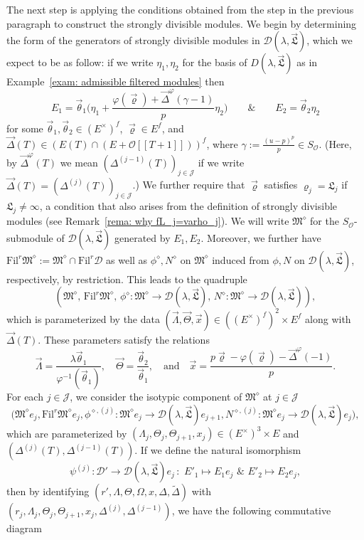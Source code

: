 \documentclass[11pt]{amsart}
\theoremstyle{definition}
\numberwithin{equation}{subsection}
\theoremstyle{plain}
\theoremstyle{plain}
\theoremstyle{plain}
\theoremstyle{plain}
\theoremstyle{plain}
\theoremstyle{plain}
\theoremstyle{plain}
\theoremstyle{plain}
\theoremstyle{plain}
\theoremstyle{plain}
\theoremstyle{plain}
\theoremstyle{plain}
\theoremstyle{definition}
\theoremstyle{definition}
\theoremstyle{definition}
\theoremstyle{remark}
\renewcommand{\(}{\textup{(}}
\renewcommand{\)}{\textup{)}}
\newcommand{\fM}{\mathfrak{M}}
\newcommand{\fL}{\mathfrak{L}}
\newcommand{\Fil}{\mathrm{Fil}}
\newcommand{\cD}{\mathcal{D}}
\newcommand{\cO}{\mathcal{O}}
\newcommand{\cJ}{\mathcal{J}}
\newcommand{\vx}{\vec{x}}
\newcommand{\vL}{\vec{\fL}}
\newcommand{\vth}{\vec{\theta}}
\newcommand{\vrho}{\vec{\varrho}}
\newcommand{\vDel}{\vec{\Delta}}
\newcommand{\vLam}{\vec{\Lambda}}
\newcommand{\vTh}{\vec{\Theta}}
\begin{document}
The next step is applying the conditions obtained from the step in the previous paragraph to construct the strongly divisible modules. We begin by determining the form of the generators of strongly divisible modules in $\cD(\lambda,\vL)$, which we expect to be as follow: if we write $\eta_1,\eta_2$ for the basis of $D(\lambda,\vL)$ as in Example~\ref{exam: admissible filtered modules} then
\begin{equation}\label{eq: intro, generators}
    E_1=\vth_1\bigg(\eta_1+\frac{\varphi(\vrho)+\vDel^\varphi(\gamma-1)}{p}\eta_2\bigg)\qquad\&\qquad E_2=\vth_2\eta_2
\end{equation}
for some $\vth_1,\vth_2\in (E^\times)^f$, $\vrho \in E^f$, and $\vDel(T)\in (E(T)\cap(E+\cO[[T+1]]))^f$, where $\gamma:=\frac{(u-p)^p}{p}\in S_\cO$. (Here, by $\vDel^\varphi(T)$ we mean $(\Delta^{(j-1)}(T))_{j\in\cJ}$ if we write $\vDel(T)=(\Delta^{(j)}(T))_{j\in\cJ}$.) We further require that $\vrho$ satisfies
$\varrho_{j}=\fL_j$ if $\fL_j\neq \infty$, a condition that also arises from the definition of strongly divisible modules (see Remark~\ref{rema: why fL_j=varho_j}). We will write $\fM^\diamond$ for the $S_\cO$-submodule of $\cD(\lambda,\vL)$ generated by $E_1,E_2$. Moreover, we further have $\Fil^r\fM^\diamond:=\fM^\diamond\cap \Fil^r\cD$ as well as $\phi^\diamond,N^\diamond$ on $\fM^\diamond$ induced from $\phi,N$ on $\cD(\lambda,\vL)$, respectively, by restriction. This leads to the quadruple
\begin{equation}\label{eq: pseudo quadruple, intro}
(\fM^\diamond,\,\Fil^r\fM^{\diamond},\,\phi^\diamond:\fM^\diamond\rightarrow\cD(\lambda,\vL),\,N^\diamond:\fM^\diamond\rightarrow\cD(\lambda,\vL)),
\end{equation} which is parameterized by the data $(\vLam,\vTh,\vx)\in ((E^\times)^{f})^{2}\times E^f$ along with $\vDel(T)$. These parameters satisfy the relations
\begin{equation}\label{eq: connection between x and L, intro}
\vLam=\frac{\lambda\vth_1}{\varphi^{-1}(\vth_1)},\quad \vTh=\frac{\vth_2}{\vth_1},\quad \mbox{and}\quad
\vx=\frac{p\vrho-\varphi(\vrho)-\vDel^\varphi(-1)}{p}.
\end{equation}
For each $j \in \cJ$, we consider the isotypic component of $\fM^\diamond$ at $j\in\cJ$
$$
\big(\fM^\diamond e_j, \Fil^r \fM^\diamond e_j, \phi^{\diamond,(j)}: \fM^\diamond e_j \to \cD(\lambda,\vL) e_{j+1}, N^{\diamond,(j)}: \fM^\diamond e_j \to \cD(\lambda,\vL) e_j\big),
$$
which are parameterized by $(\Lambda_j,\Theta_j,\Theta_{j+1},x_j)\in (E^{\times})^3\times E$ and $(\Delta^{(j)}(T),\Delta^{(j-1)}(T))$. If we define the natural isomorphism $$\psi^{(j)}:\cD'\rightarrow \cD(\lambda,\vL)e_j\,:\,\,E'_1\mapsto E_1e_j\,\,\&\,\,E'_2\mapsto E_2e_j,$$ then by identifying $(r',\Lambda,\Theta,\Omega,x,\Delta,\tilde{\Delta})$ with $(r_j,\Lambda_j,\Theta_j,\Theta_{j+1},x_j,\Delta^{(j)},\Delta^{(j-1)})$, we have the following commutative diagram
\end{document}
